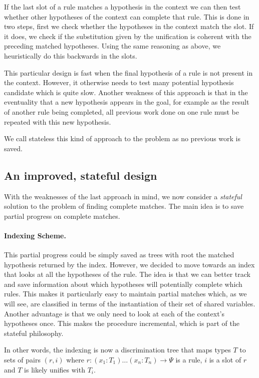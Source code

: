 \documentclass[runningheads]{llncs}
\begin{document}
If the last slot of a rule matches a hypothesis in the context we can then test whether other hypotheses of the context can complete that rule.
This is done in two steps, first we check whether the hypotheses in the context match the slot.
If it does, we check if the substitution given by the unification is coherent with the preceding matched hypotheses.
Using the same reasoning as above, we heuristically do this backwards in the slots.

This particular design is fast when the final hypothesis of a rule is not present in the context. 
However, it otherwise needs to test many potential hypothesis candidate which is quite slow.
Another weakness of this approach is that in the eventuality that a new hypothesis appears in the goal, for example as the result of another rule being completed, all previous work done on one rule must be repeated with this new hypothesis.

We call stateless this kind of approach to the problem as no previous work is saved.

\subsection{An improved, stateful design}

With the weaknesses of the last approach in mind, we now consider a \textit{stateful} solution to the problem of finding complete matches.
The main idea is to save partial progress on complete matches.

\paragraph{Indexing Scheme.}
This partial progress could be simply saved as trees with root the matched hypothesis returned by the index.
However, we decided to move towards an index that looks at all the hypotheses of the rule.
The idea is that we can better track and save information about which hypotheses will potentially complete which rules.
This makes it particularly easy to maintain partial matches which, as we will see, are classified in terms of the instantiation of their set of shared variables.
Another advantage is that we only need to look at each of the context's hypotheses once.
This makes the procedure incremental, which is part of the stateful philosophy.

In other words, the indexing is now a discrimination tree that maps types $T$ to sets of pairs $(r,i)$ where $r : (x_1 : T_1) \dots (x_n : T_n) \to \Psi$ is a rule, $i$ is a slot of $r$ and $T$ is likely unifies with $T_i$.
\end{document}
